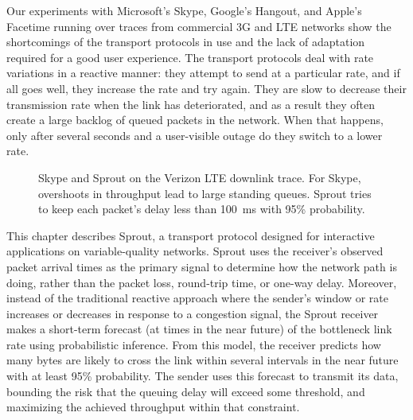 Our experiments with Microsoft's Skype, Google's Hangout, and Apple's
Facetime running over traces from commercial 3G and LTE networks show
the shortcomings of the transport protocols in use and the lack of
adaptation required for a good user experience.
The transport protocols deal with rate variations in a reactive
manner: they attempt to send at a particular rate, and if all goes
well, they increase the rate and try again. They are slow to
decrease their transmission rate when the link has deteriorated, and as a
result they often create a large backlog of queued packets in the
network. When that happens, only after several seconds and a
user-visible outage do they switch to a lower rate.


\begin{figure}
\caption{Skype and Sprout on the Verizon LTE downlink trace. For Skype, overshoots in throughput lead to large standing queues. Sprout tries to keep each
packet's delay less than 100~ms with 95\% probability.}
\label{fig:skypevssprout}
\vspace{\baselineskip}
\def\svgwidth{\columnwidth}
\end{figure}

This chapter describes Sprout, a transport protocol designed for
interactive applications on variable-quality networks. Sprout uses the
receiver's observed packet arrival times as the primary signal to
determine how the network path is doing, rather than the packet loss,
round-trip time, or one-way delay. Moreover, instead of the
traditional reactive approach where the sender's window or rate
increases or decreases in response to a congestion signal, the Sprout
receiver makes a short-term forecast (at times in the near future) of
the bottleneck link rate using probabilistic inference.  From this
model, the receiver predicts how many bytes are likely to cross the
link within several intervals in the near future with at least 95\%
probability. The sender uses this forecast to transmit its data,
bounding the risk that the queuing delay will exceed some threshold,
and maximizing the achieved throughput within that constraint.

